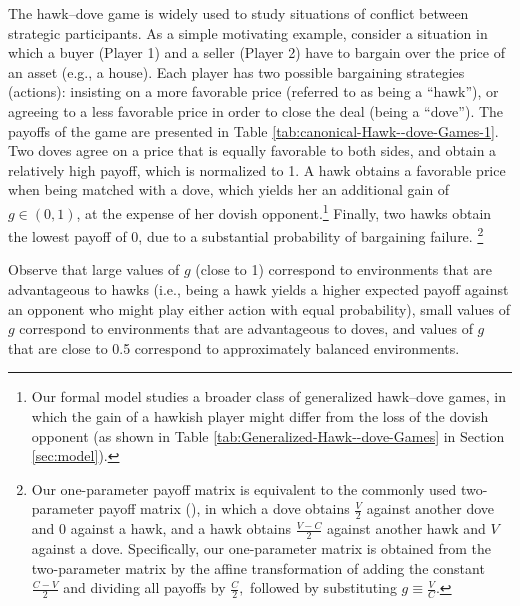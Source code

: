 \documentclass[12pt]{article}
\numberwithin{equation}{section}
\numberwithin{figure}{section}
\theoremstyle{definition}
\theoremstyle{plain}
\theoremstyle{plain}
\theoremstyle{plain}
\theoremstyle{remark}
\theoremstyle{plain}
\theoremstyle{plain}
\begin{document}
The hawk--dove game is 
widely used to study situations of conflict between strategic participants. As a simple motivating example,
consider a situation in which a buyer (Player 1) and a seller (Player 2) have to bargain over the price of an asset (e.g., a house). Each player has two possible bargaining strategies (actions): insisting on a more favorable price (referred to as being a ``hawk''), or agreeing to a less favorable price in order to close the deal (being a ``dove''). The payoffs of the game are presented in Table \ref{tab:canonical-Hawk--dove-Games-1}. 
Two doves agree on a price that is equally favorable to both sides, and obtain a relatively high payoff, which is normalized to 1. A hawk obtains a favorable price when being matched with a dove, which yields her an additional gain of $g\in(0,1)$, at the expense of her dovish opponent.\footnote{
Our formal model studies a broader class of generalized hawk--dove games, in which the gain of a hawkish player might differ from the loss of the dovish opponent (as shown in Table \ref{tab:Generalized-Hawk--dove-Games} in Section \ref{sec:model}).} 
 Finally, two hawks obtain the lowest payoff of 0, due to a substantial probability of bargaining failure.
\footnote{
Our one-parameter payoff matrix is equivalent to the commonly used two-parameter payoff matrix (\citealp{smith1982evolution}), in which a dove obtains $\frac{V}{2}$ against another dove and 0 against a hawk, and a hawk obtains $\frac{V-C}{2}$ against another hawk and $V$ against a dove. Specifically, our one-parameter matrix is obtained from the two-parameter matrix by the affine transformation of adding the constant $\frac{C-V}{2}$ and dividing all payoffs by $\frac{C}{2},$ followed by substituting $g\equiv\frac{V}{C}.$}

 Observe that large values of $g$ (close to 1) correspond to environments that are advantageous to hawks (i.e., being a hawk yields a higher expected payoff against an opponent who might play either action with equal probability), small values of $g$ correspond to environments that are advantageous to doves, and values of $g$ that are close to 0.5 correspond to approximately balanced environments.
\end{document}

